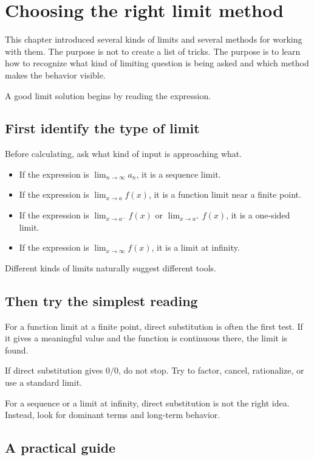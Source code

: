 \section{Choosing the right limit method}

This chapter introduced several kinds of limits and several methods for working with them. The purpose is not to create a list of tricks. The purpose is to learn how to recognize what kind of limiting question is being asked and which method makes the behavior visible.

A good limit solution begins by reading the expression.

\subsection*{First identify the type of limit}

Before calculating, ask what kind of input is approaching what.

\begin{itemize}
\item If the expression is \(\lim_{n\to\infty}a_n\), it is a sequence limit.
\item If the expression is \(\lim_{x\to a}f(x)\), it is a function limit near a finite point.
\item If the expression is \(\lim_{x\to a^-}f(x)\) or \(\lim_{x\to a^+}f(x)\), it is a one-sided limit.
\item If the expression is \(\lim_{x\to\infty}f(x)\), it is a limit at infinity.
\end{itemize}

Different kinds of limits naturally suggest different tools.

\subsection*{Then try the simplest reading}

For a function limit at a finite point, direct substitution is often the first test. If it gives a meaningful value and the function is continuous there, the limit is found.

If direct substitution gives \(0/0\), do not stop. Try to factor, cancel, rationalize, or use a standard limit.

For a sequence or a limit at infinity, direct substitution is not the right idea. Instead, look for dominant terms and long-term behavior.

\subsection*{A practical guide}

